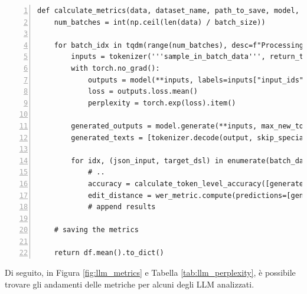 \begin{algorithm}[ht]
	\caption{Script per la valutazione oggettiva di un LLM}
	\label{lst:evaluation}
     \scriptsize
	\begin{Verbatim}[numbers=left,breaklines]
def calculate_metrics(data, dataset_name, path_to_save, model, tokenizer, batch_size=36):
    num_batches = int(np.ceil(len(data) / batch_size))
    
    for batch_idx in tqdm(range(num_batches), desc=f"Processing {dataset_name}", unit="batch"):
        inputs = tokenizer('''sample_in_batch_data''', return_tensors="pt", padding=True, truncation=True)
        with torch.no_grad():
            outputs = model(**inputs, labels=inputs["input_ids"])
            loss = outputs.loss.mean()
            perplexity = torch.exp(loss).item()

        generated_outputs = model.generate(**inputs, max_new_tokens=300)
        generated_texts = [tokenizer.decode(output, skip_special_tokens=True) for output in generated_outputs]

        for idx, (json_input, target_dsl) in enumerate(batch_data):
            # ..
            accuracy = calculate_token_level_accuracy([generated_tokens], [target_tokens])
            edit_distance = wer_metric.compute(predictions=[generated_dsl], references=[target_dsl])
            # append results

    # saving the metrics

    return df.mean().to_dict()
	\end{Verbatim}
\end{algorithm}
Di seguito, in Figura \ref{fig:llm_metrics} e Tabella \ref{tab:llm_perplexity}, è possibile trovare gli andamenti delle metriche per alcuni degli LLM analizzati. 

